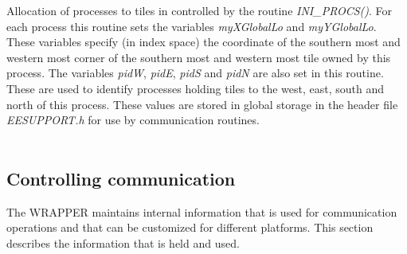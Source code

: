 Allocation of processes to tiles in controlled by the routine
{\em INI\_PROCS()}. For each process this routine sets
the variables {\em myXGlobalLo} and {\em myYGlobalLo}.
These variables specify (in index space) the coordinate
of the southern most and western most corner of the 
southern most and western most tile owned by this process.
The variables {\em pidW}, {\em pidE}, {\em pidS} and {\em pidN}
are also set in this routine. These are used to identify
processes holding tiles to the west, east, south and north 
of this process. These values are stored in global storage
in the header file {\em EESUPPORT.h} for use by
communication routines.
\\

 \\


\subsection{Controlling communication}
The WRAPPER maintains internal information that is used for communication
operations and that can be customized for different platforms. This section 
describes the information that is held and used.

